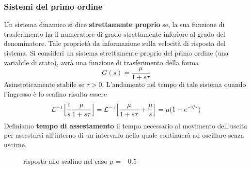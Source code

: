 \documentclass[10pt, letterpaper]{report}
\begin{document}
\subsubsection{Sistemi del primo ordine}
 Un sistema dinamico si dice \textbf{strettamente proprio} 
se, la sua funzione di trasferimento ha il numeratore di grado 
strettamente inferiore al grado del denominatore. 
Tale proprietà da informazione sulla velocità di risposta 
del sistema.\acc
Si consideri un sistema strettamente proprio del primo ordine (una variabile di stato), 
avrà una funzione di trasferimento della forma 
$$ G(s)=\frac{\mu}{1+s\tau}$$
Asinstoticamente stabile se $\tau>0$. L'andamento nel tempo di tale sistema quando l'ingresso è 
lo scalino risulta essere 
$$ \mathcal{L}^{-1}\Big[\frac{1}{s}\frac{\mu}{1+s\tau}\Big]
=\mathcal{L}^{-1}\Big[\frac{\mu}{1+s\tau}+\frac{\mu}{s}\Big]=
\mu(1-e^{-\nicefrac{t}{\tau}})$$
Definiamo \textbf{tempo di assestamento} il 
tempo necessario al movimento dell'uscita per 
assestarsi all'interno di un intervallo nella quale continuerà 
ad oscillare senza uscirne.\begin{center}
    \begin{figure}[h!]
        \centering
            \caption{risposta allo scalino nel caso $\mu = -0.5$}
    \end{figure}
    \end{center}
\end{document}
